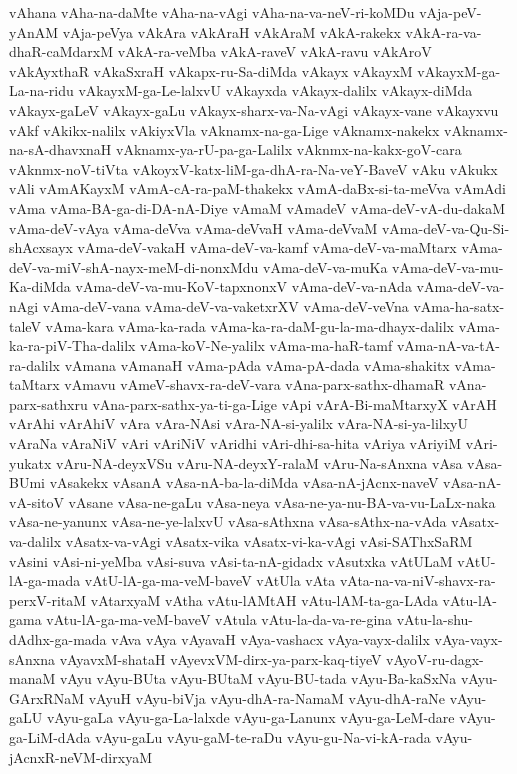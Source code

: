 {vAhana
vAha-na-daMte
vAha-na-vAgi
vAha-na-va-neV-ri-koMDu
vAja-peV-yAnAM
vAja-peVya
vAkAra
vAkAraH
vAkAraM
vAkA-rakekx
vAkA-ra-va-dhaR-caMdarxM
vAkA-ra-veMba
vAkA-raveV
vAkA-ravu
vAkAroV
vAkAyxthaR
vAkaSxraH
vAkapx-ru-Sa-diMda
vAkayx
vAkayxM
vAkayxM-ga-La-na-ridu
vAkayxM-ga-Le-lalxvU
vAkayxda
vAkayx-dalilx
vAkayx-diMda
vAkayx-gaLeV
vAkayx-gaLu
vAkayx-sharx-va-Na-vAgi
vAkayx-vane
vAkayxvu
vAkf
vAkikx-nalilx
vAkiyxVla
vAknamx-na-ga-Lige
vAknamx-nakekx
vAknamx-na-sA-dhavxnaH
vAknamx-ya-rU-pa-ga-Lalilx
vAknmx-na-kakx-goV-cara
vAknmx-noV-tiVta
vAkoyxV-katx-liM-ga-dhA-ra-Na-veY-BaveV
vAku
vAkukx
vAli
vAmAKayxM
vAmA-cA-ra-paM-thakekx
vAmA-daBx-si-ta-meVva
vAmAdi
vAma
vAma-BA-ga-di-DA-nA-Diye
vAmaM
vAmadeV
vAma-deV-vA-du-dakaM
vAma-deV-vAya
vAma-deVva
vAma-deVvaH
vAma-deVvaM
vAma-deV-va-Qu-Si-shAcxsayx
vAma-deV-vakaH
vAma-deV-va-kamf
vAma-deV-va-maMtarx
vAma-deV-va-miV-shA-nayx-meM-di-nonxMdu
vAma-deV-va-muKa
vAma-deV-va-mu-Ka-diMda
vAma-deV-va-mu-KoV-tapxnonxV
vAma-deV-va-nAda
vAma-deV-va-nAgi
vAma-deV-vana
vAma-deV-va-vaketxrXV
vAma-deV-veVna
vAma-ha-satx-taleV
vAma-kara
vAma-ka-rada
vAma-ka-ra-daM-gu-la-ma-dhayx-dalilx
vAma-ka-ra-piV-Tha-dalilx
vAma-koV-Ne-yalilx
vAma-ma-haR-tamf
vAma-nA-va-tA-ra-dalilx
vAmana
vAmanaH
vAma-pAda
vAma-pA-dada
vAma-shakitx
vAma-taMtarx
vAmavu
vAmeV-shavx-ra-deV-vara
vAna-parx-sathx-dhamaR
vAna-parx-sathxru
vAna-parx-sathx-ya-ti-ga-Lige
vApi
vArA-Bi-maMtarxyX
vArAH
vArAhi
vArAhiV
vAra
vAra-NAsi
vAra-NA-si-yalilx
vAra-NA-si-ya-lilxyU
vAraNa
vAraNiV
vAri
vAriNiV
vAridhi
vAri-dhi-sa-hita
vAriya
vAriyiM
vAri-yukatx
vAru-NA-deyxVSu
vAru-NA-deyxY-ralaM
vAru-Na-sAnxna
vAsa
vAsa-BUmi
vAsakekx
vAsanA
vAsa-nA-ba-la-diMda
vAsa-nA-jAcnx-naveV
vAsa-nA-vA-sitoV
vAsane
vAsa-ne-gaLu
vAsa-neya
vAsa-ne-ya-nu-BA-va-vu-LaLx-naka
vAsa-ne-yanunx
vAsa-ne-ye-lalxvU
vAsa-sAthxna
vAsa-sAthx-na-vAda
vAsatx-va-dalilx
vAsatx-va-vAgi
vAsatx-vika
vAsatx-vi-ka-vAgi
vAsi-SAThxSaRM
vAsini
vAsi-ni-yeMba
vAsi-suva
vAsi-ta-nA-gidadx
vAsutxka
vAtULaM
vAtU-lA-ga-mada
vAtU-lA-ga-ma-veM-baveV
vAtUla
vAta
vAta-na-va-niV-shavx-ra-perxV-ritaM
vAtarxyaM
vAtha
vAtu-lAMtAH
vAtu-lAM-ta-ga-LAda
vAtu-lA-gama
vAtu-lA-ga-ma-veM-baveV
vAtula
vAtu-la-da-va-re-gina
vAtu-la-shu-dAdhx-ga-mada
vAva
vAya
vAyavaH
vAya-vashacx
vAya-vayx-dalilx
vAya-vayx-sAnxna
vAyavxM-shataH
vAyevxVM-dirx-ya-parx-kaq-tiyeV
vAyoV-ru-dagx-manaM
vAyu
vAyu-BUta
vAyu-BUtaM
vAyu-BU-tada
vAyu-Ba-kaSxNa
vAyu-GArxRNaM
vAyuH
vAyu-biVja
vAyu-dhA-ra-NamaM
vAyu-dhA-raNe
vAyu-gaLU
vAyu-gaLa
vAyu-ga-La-lalxde
vAyu-ga-Lanunx
vAyu-ga-LeM-dare
vAyu-ga-LiM-dAda
vAyu-gaLu
vAyu-gaM-te-raDu
vAyu-gu-Na-vi-kA-rada
vAyu-jAcnxR-neVM-dirxyaM
}
